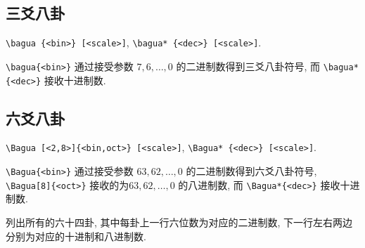 \documentclass{article}
\begin{document}
\subsection{三爻八卦}
\verb+\bagua {<bin>} [<scale>]+, \verb+\bagua* {<dec>} [<scale>]+.

\verb+\bagua{<bin>}+ 通过接受参数 $7,6,\dots,0$ 的二进制数得到三爻八卦符号, 而 \verb+\bagua*{<dec>}+ 接收十进制数.

\begin{center}
\end{center}

\subsection{六爻八卦}
\verb+\Bagua [<2,8>]{<bin,oct>} [<scale>]+, \verb+\Bagua* {<dec>} [<scale>]+.

\verb+\Bagua{<bin>}+ 通过接受参数 $63,62,\dots,0$ 的二进制数得到六爻八卦符号, \verb+\Bagua[8]{<oct>}+ 接收的为$63,62,\dots,0$ 的八进制数, 而 \verb+\Bagua*{<dec>}+ 接收十进制数.

列出所有的六十四卦, 其中每卦上一行六位数为对应的二进制数, 下一行左右两边分别为对应的十进制和八进制数.

\begin{center}
\end{center}

\printindex
\end{document}

